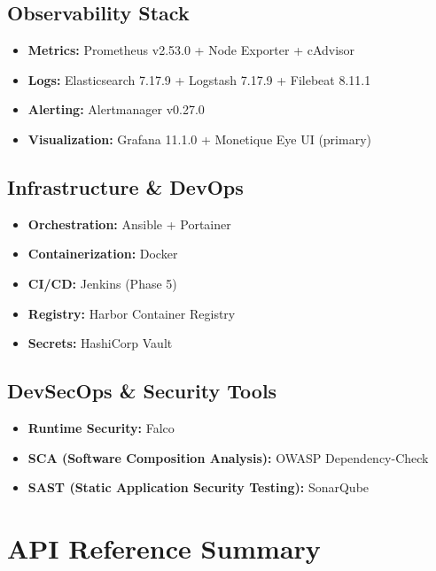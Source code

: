 \documentclass[12pt,a4paper]{report}
\begin{document}
\subsection{Observability Stack}

\begin{itemize}
  \item \textbf{Metrics:} Prometheus v2.53.0 + Node Exporter + cAdvisor
  \item \textbf{Logs:} Elasticsearch 7.17.9 + Logstash 7.17.9 + Filebeat 8.11.1
  \item \textbf{Alerting:} Alertmanager v0.27.0
  \item \textbf{Visualization:} Grafana 11.1.0 + Monetique Eye UI (primary)
\end{itemize}

\subsection{Infrastructure \& DevOps}

\begin{itemize}
  \item \textbf{Orchestration:} Ansible + Portainer
  \item \textbf{Containerization:} Docker
  \item \textbf{CI/CD:} Jenkins (Phase 5)
  \item \textbf{Registry:} Harbor Container Registry
  \item \textbf{Secrets:} HashiCorp Vault
\end{itemize}

\subsection{DevSecOps \& Security Tools}

\begin{itemize}
  \item \textbf{Runtime Security:} Falco
  \item \textbf{SCA (Software Composition Analysis):} OWASP Dependency-Check
  \item \textbf{SAST (Static Application Security Testing):} SonarQube
\end{itemize}

\section{API Reference Summary}\label{app:api_reference}
\end{document}
